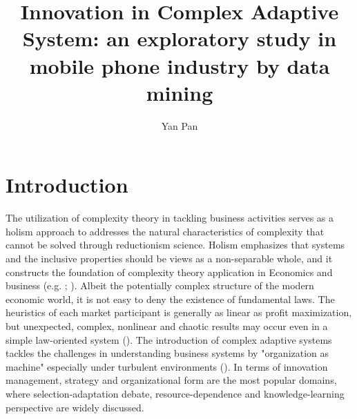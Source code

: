 \documentclass[utf8,english]{gradu3}
\begin{document}
\title{Innovation in Complex Adaptive System: an exploratory study in mobile phone industry by data mining}
\author{Yan Pan}

\maketitle

\mainmatter

\chapter{Introduction}

The utilization of complexity theory in tackling business activities serves as a holism approach to addresses the natural characteristics of complexity that cannot be solved through reductionism science. Holism emphasizes that systems and the inclusive properties should be views as a non-separable whole, and it constructs the foundation of complexity theory application in Economics and business (e.g. \cite{smuts1926holism}; \cite{auyang1999foundations}). Albeit the potentially complex structure of the modern economic world, it is not easy to deny the existence of fundamental laws. The heuristics of each market participant is generally as linear as profit maximization, but unexpected, complex, nonlinear and chaotic results may occur even in a simple law-oriented system (\cite{nicolis1995introduction}). The introduction of complex adaptive systems tackles the challenges in understanding business systems by "organization as machine" especially under turbulent environments (\cite{dooley1997complex}). In terms of innovation management, strategy and organizational form are the most popular domains, where selection-adaptation debate, resource-dependence and knowledge-learning perspective are widely discussed. 
\end{document}
